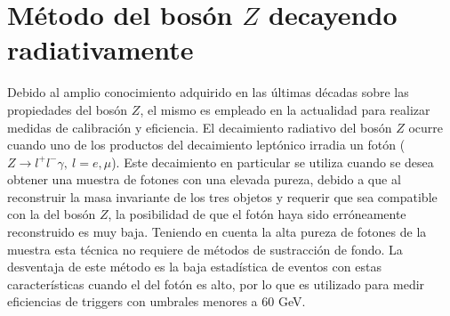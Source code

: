 \begin{table} 
\caption{Menú del trigger de fotones utilizados a lo largo de cada año durante el Run 2}
	\centering
{}
	\label{TrigMenu}
\end{table}




\section{Método del bosón $Z$ decayendo radiativamente}

Debido al amplio conocimiento adquirido en las últimas décadas sobre las propiedades del bosón $Z$, el mismo es empleado en la actualidad para realizar medidas de calibración y eficiencia. El decaimiento radiativo del bosón $Z$ ocurre cuando uno de los productos del decaimiento leptónico irradia un fotón ($Z\to l^{+}l^{-}\gamma,\:l=e,\mu$). Este decaimiento en particular se utiliza cuando se desea obtener una muestra de fotones con una elevada pureza, debido a que al reconstruir la masa invariante de los tres objetos y requerir que sea compatible con la del bosón $Z$, la posibilidad de que el fotón haya sido erróneamente reconstruido es muy baja. Teniendo en cuenta la alta pureza de fotones de la muestra esta técnica no requiere de métodos de sustracción de fondo. La desventaja de este método es la baja estadística de eventos con estas características cuando el \pt del fotón es alto, por lo que es utilizado para medir eficiencias de triggers con umbrales menores a 60 GeV.

